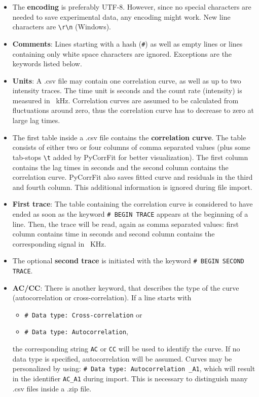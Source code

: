 \begin{itemize}

\item The \textbf{encoding} is preferably UTF-8. However, since no special characters are needed to save experimental data, any encoding might work. New line characters are \texttt{\textbackslash r\textbackslash n} (Windows).

\item \textbf{Comments}: Lines starting with a hash (\texttt{\#}) as well as empty lines or lines containing only white space characters are ignored. Exceptions are the keywords listed below.

\item \textbf{Units}: A \mytilde .csv file may contain one correlation curve, as well as up to two intensity traces. The time unit is seconds and the count rate (intensity) is measured in \SI{}{kHz}. Correlation curves are assumed to be calculated from fluctuations around zero, thus the correlation curve has to decrease to zero at large lag times.

\item The first table inside a \mytilde .csv file contains the \textbf{correlation curve}. The table consists of either two or four columns of comma separated values (plus some tab-stops \texttt{\textbackslash t} added by PyCorrFit for better visualization). The first column contains the lag times in seconds and the second column contains the correlation curve. PyCorrFit also saves fitted curve and residuals in the third and fourth column. This additional information is ignored during file import.

\item \textbf{First trace}: The table containing the correlation curve is considered to have ended as soon as the keyword \texttt{\# BEGIN TRACE} appears at the beginning of a line. Then, the trace will be read, again as comma separated values: first column contains time in seconds and second column contains the corresponding signal in \SI{}{KHz}.

\item The optional \textbf{second trace} is initiated with the keyword \texttt{\# BEGIN SECOND TRACE}.

\item \textbf{AC/CC}: There is another keyword, that describes the type of the curve (autocorrelation or cross-correlation). If a line starts with
	\begin{itemize}
	\item \texttt{\# Data type: Cross-correlation} or
	\item \texttt{\# Data type: Autocorrelation},
	\end{itemize}
the corresponding string \texttt{AC} or \texttt{CC} will be used to identify the curve. If no data type is specified, autocorrelation will be assumed. Curves may be personalized by using: \texttt{\# Data type: Autocorrelation \_A1}, which will result in the identifier \texttt{AC\_A1} during import. This is necessary to distinguish many \mytilde .csv files inside a \mytilde .zip file.

\end{itemize}

